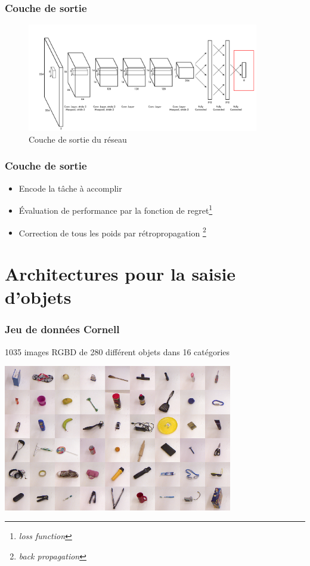 \documentclass{beamer}
\begin{document}
\begin{frame}
  \frametitle{Couche de sortie}
  \begin{figure}
    \centering
    \includegraphics[width=0.9\textwidth]{img/last-layer.png}
    \caption{Couche de sortie du réseau}
    \label{fig:last_layer}
  \end{figure}
\end{frame}

\begin{frame}
  \frametitle{Couche de sortie}
  \begin{itemize}
  \item Encode la tâche à accomplir
  \item Évaluation de performance par la fonction de regret\footnote{\emph{loss function}}
  \item Correction de tous les poids par rétropropagation \footnote{\emph{back propagation}}
  \end{itemize}
\end{frame}

\section{Architectures pour la saisie d'objets}
\begin{frame}
  \frametitle{Jeu de données Cornell}
  1035 images RGBD de 280 différent objets dans 16 catégories
  \begin{center}
  \includegraphics[width=0.75\textwidth]{img/cornell.png}
  \end{center}
\end{frame}
\end{document}
